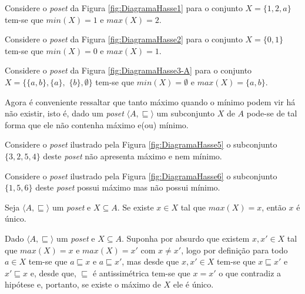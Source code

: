 \begin{exemplo}
	Considere o \textit{poset} da Figura \ref{fig:DiagramaHasse1} para o conjunto $X = \{1, 2, a\}$ tem-se que $min(X) = 1$ e $max(X) = 2$.
\end{exemplo}

\begin{exemplo}
	Considere o \textit{poset} da Figura \ref{fig:DiagramaHasse2} para o conjunto $X = \{0, 1\}$ tem-se que $min(X) = 0$ e $max(X) = 1$.
\end{exemplo}

\begin{exemplo}
	Considere o \textit{poset} da Figura \ref{fig:DiagramaHasse3-A} para o conjunto $X = \{\{a, b\}, \{a\},$ $\{b\}, \emptyset\}$ tem-se que $min(X) = \emptyset$ e $max(X) = \{a, b\}$.
\end{exemplo}

Agora é conveniente ressaltar que tanto máximo quando o mínimo podem vir há não existir, isto é, dado um \textit{poset} $\langle A, \sqsubseteq \rangle$ um subconjunto $X$ de $A$ pode-se de tal forma que ele não contenha máximo e(ou) mínimo.

\begin{exemplo}
	Considere o \textit{poset} ilustrado pela Figura \ref{fig:DiagramaHasse5} o subconjunto $\{3, 2, 5, 4\}$ deste \textit{poset} não apresenta máximo e nem mínimo.
\end{exemplo}

\begin{exemplo}
	Considere o \textit{poset} ilustrado pela Figura \ref{fig:DiagramaHasse6} o subconjunto $\{1, 5, 6\}$ deste \textit{poset} possui máximo mas não possui mínimo.
\end{exemplo}

\begin{teorema}\label{teo:UnicidadeMaximoPoset}
	Seja $\langle A, \sqsubseteq \rangle$ um \textit{poset} e $X \subseteq A$. Se existe $x \in X$ tal que $max(X) = x$, então $x$ é único.
\end{teorema}

\begin{prova}
	Dado $\langle A, \sqsubseteq \rangle$ um \textit{poset} e $X \subseteq A$. Suponha por absurdo que existem $x, x' \in X$ tal que $max(X) = x$ e $max(X) = x'$ com $x \neq x'$, logo por definição para todo $a \in X$ tem-se que $a \sqsubseteq x$ e $a \sqsubseteq x'$, mas desde que $x, x '\in X$ tem-se que $x \sqsubseteq x'$ e $x' \sqsubseteq x$ e, desde que, $\sqsubseteq$ é antissimétrica tem-se que $x = x'$ o que contradiz a hipótese e, portanto, se existe o máximo de $X$ ele é único.
\end{prova}

